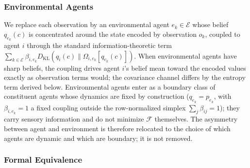 \subsubsection{Environmental Agents}

We replace each observation by an environmental agent $e_k \in \mathcal{E}$ whose belief $q_{e_k}(c)$ is concentrated around the state encoded by observation $o_k$, coupled to agent $i$ through the standard information-theoretic term $\sum_{k \in \mathcal{E}} \beta_{i,e_k}  D_{\mathrm{KL}}(q_i(c) \| \Omega_{i,e_k}[q_{e_k}(c)])$. When environmental agents have sharp beliefs, the coupling drives agent $i$'s belief mean toward the encoded values exactly as observation terms would; the covariance channel differs by the entropy term derived below. Environmental agents enter as a boundary class of constituent agents whose dynamics are fixed by construction ($q_{e_k} = p_{e_k}$, with $\beta_{i,e_k} = 1$ a fixed coupling outside the row-normalized simplex $\sum_j \beta_{ij} = 1$); they carry sensory information and do not minimize $\mathcal{F}$ themselves. The asymmetry between agent and environment is therefore relocated to the choice of which agents are dynamic and which are boundary; it is not removed.

\subsubsection{Formal Equivalence}

